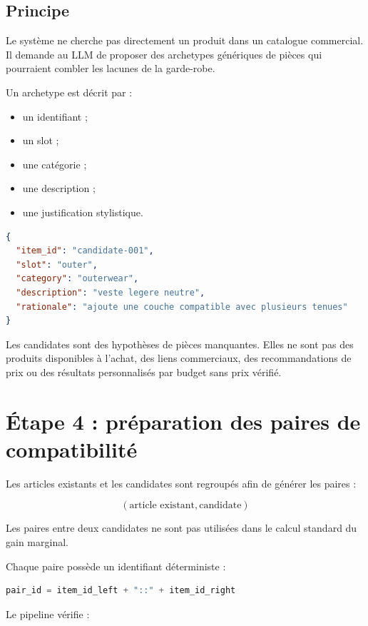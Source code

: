 \documentclass[11pt,a4paper]{article}
\begin{document}
\subsection{Principe}

Le système ne cherche pas directement un produit dans un catalogue commercial.
Il demande au LLM de proposer des archetypes génériques de pièces qui pourraient
combler les lacunes de la garde-robe.

Un archetype est décrit par :

\begin{itemize}[leftmargin=*]
    \item un identifiant ;
    \item un slot ;
    \item une catégorie ;
    \item une description ;
    \item une justification stylistique.
\end{itemize}

\begin{lstlisting}[language=json]
{
  "item_id": "candidate-001",
  "slot": "outer",
  "category": "outerwear",
  "description": "veste legere neutre",
  "rationale": "ajoute une couche compatible avec plusieurs tenues"
}
\end{lstlisting}

Les candidates sont des hypothèses de pièces manquantes. Elles ne sont pas des
produits disponibles à l'achat, des liens commerciaux, des recommandations de
prix ou des résultats personnalisés par budget sans prix vérifié.

\section{Étape 4 : préparation des paires de compatibilité}

Les articles existants et les candidates sont regroupés afin de générer les
paires :

\[
(\text{article existant},\text{candidate})
\]

Les paires entre deux candidates ne sont pas utilisées dans le calcul standard
du gain marginal.

Chaque paire possède un identifiant déterministe :

\begin{lstlisting}[language=Python]
pair_id = item_id_left + "::" + item_id_right
\end{lstlisting}

Le pipeline vérifie :
\end{document}

